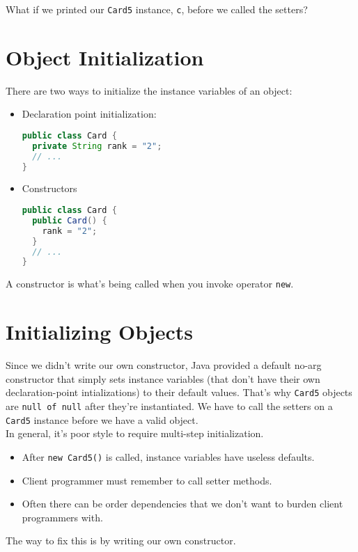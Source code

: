 \documentclass{article}
\begin{document}
What if we printed our {\tt Card5} instance, {\tt c}, before we called the setters?





\section{Object Initialization}


There are two ways to initialize the instance variables of an object:
\begin{itemize}
\item Declaration point initialization:
\begin{lstlisting}[language=Java,mathescape=true]
public class Card {
  private String rank = "2";
  // ...
}
\end{lstlisting}
\item Constructors
\begin{lstlisting}[language=Java,mathescape=true]
public class Card {
  public Card() {
    rank = "2";
  }
  // ...
}
\end{lstlisting}

\end{itemize}
A constructor is what's being called when you invoke operator {\tt new}.




\section{Initializing Objects}


Since we didn't write our own constructor, Java provided a default no-arg constructor that simply sets instance variables (that don't have their own declaration-point intializations) to their default values.  That's why {\tt Card5} objects are {\tt null of null} after they're instantiated.  We have to call the setters on a {\tt Card5} instance before we have a valid object.\\


In general, it's poor style to require multi-step initialization.
\begin{itemize}
\item After {\tt new Card5()} is called, instance variables have useless defaults.
\item Client programmer must remember to call setter methods.
\item Often there can be order dependencies that we don't want to burden client programmers with.
\end{itemize}
The way to fix this is by writing our own constructor.
\end{document}
